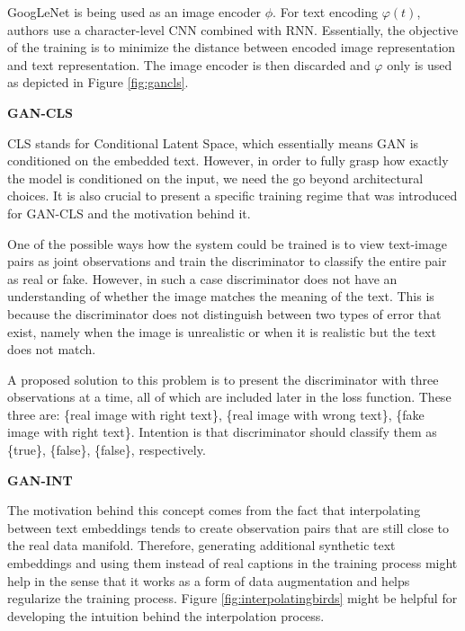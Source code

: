 \documentclass[
]{krantz}
\begin{document}
GoogLeNet is being used as an image encoder \(\phi\). For text encoding \(\varphi(t)\), authors use a character-level CNN combined with RNN. Essentially, the objective of the training is to minimize the distance between encoded image representation and text representation. The image encoder is then discarded and \(\varphi\) only is used as depicted in Figure \ref{fig:gancls}.

\textbf{GAN-CLS}

CLS stands for Conditional Latent Space, which essentially means GAN is conditioned on the embedded text. However, in order to fully grasp how exactly the model is conditioned on the input, we need the go beyond architectural choices. It is also crucial to present a specific training regime that was introduced for GAN-CLS and the motivation behind it.

One of the possible ways how the system could be trained is to view text-image pairs as joint observations and train the discriminator to classify the entire pair as real or fake. However, in such a case discriminator does not have an understanding of whether the image matches the meaning of the text. This is because the discriminator does not distinguish between two types of error that exist, namely when the image is unrealistic or when it is realistic but the text does not match.

A proposed solution to this problem is to present the discriminator with three observations at a time, all of which are included later in the loss function. These three are: \{real image with right text\}, \{real image with wrong text\}, \{fake image with right text\}. Intention is that discriminator should classify them as \{true\}, \{false\}, \{false\}, respectively.

\textbf{GAN-INT}

The motivation behind this concept comes from the fact that interpolating between text embeddings tends to create observation pairs that are still close to the real data manifold. Therefore, generating additional synthetic text embeddings and using them instead of real captions in the training process might help in the sense that it works as a form of data augmentation and helps regularize the training process. Figure \ref{fig:interpolatingbirds} might be helpful for developing the intuition behind the interpolation process.
\end{document}

